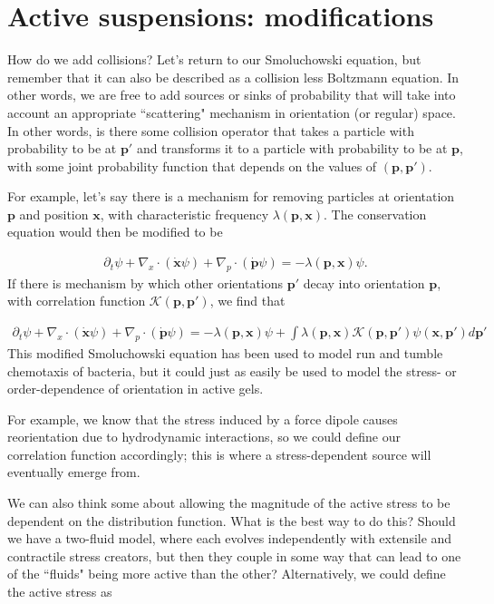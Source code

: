 \documentclass[onecolumn,showpacs,preprintnumbers,prl,amsmath,amssymb]{revtex4-1}
\def\b{\mathbf}
\begin{document}
\section{Active suspensions: modifications}

How do we add collisions? Let's return to our Smoluchowski equation, but remember that it can also be described as a collision less Boltzmann equation. In other words, we are free to add sources or sinks of probability that will take into account an appropriate ``scattering" mechanism in orientation (or regular) space. In other words, is there some collision operator that takes a particle with probability to be at $\b{p}'$ and transforms it to a particle with probability to be at $\b{p}$, with some joint probability function that depends on the values of $(\b{p},\b{p}')$.

For example, let's say there is a mechanism for removing particles at orientation $\b{p}$ and position $\b{x}$, with characteristic frequency $\lambda(\b{p},\b{x})$. The conservation equation would then be modified to be 

\begin{gather}
\partial_t\psi+\nabla_x\cdot(\b{\dot{x}}\psi)+\nabla_p\cdot(\b{\dot{p}}\psi)=-\lambda(\b{p},\b{x})\psi.
\end{gather}
If there is mechanism by which other orientations $\b{p}'$ decay into orientation $\b{p}$, with correlation function $\mathcal{K}(\b{p},\b{p}')$, we find that

\begin{gather}
\partial_t\psi+\nabla_x\cdot(\b{\dot{x}}\psi)+\nabla_p\cdot(\b{\dot{p}}\psi)=-\lambda(\b{p},\b{x})\psi+\int{\lambda(\b{p},\b{x})\mathcal{K}(\b{p},\b{p}')\psi(\b{x},\b{p}')}d\b{p}'
\end{gather}
This modified Smoluchowski equation has been used to model run and tumble chemotaxis of bacteria, but it could just as easily be used to model the stress- or order-dependence of orientation in active gels.

For example, we know that the stress induced by a force dipole causes reorientation due to hydrodynamic interactions, so we could define our correlation function accordingly; this is where a stress-dependent source will eventually emerge from.

We can also think some about allowing the magnitude of the active stress to be dependent on the distribution function. What is the best way to do this? Should we have a two-fluid model, where each evolves independently with extensile and contractile stress creators, but then they couple in some way that can lead to one of the ``fluids" being more active than the other? Alternatively, we could define the active stress as 
\end{document}
